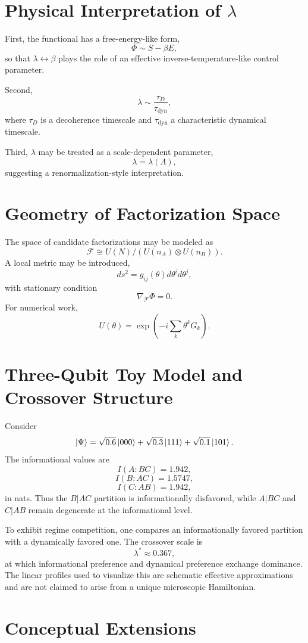 \documentclass[11pt]{article}
\begin{document}
\section{Physical Interpretation of $\lambda$}
First, the functional has a free-energy-like form,
\[
\Phi \sim S-\beta E,
\]
so that $\lambda\leftrightarrow\beta$ plays the role of an effective inverse-temperature-like control parameter.

Second,
\[
\lambda \sim \frac{\tau_D}{\tau_{\mathrm{dyn}}},
\]
where $\tau_D$ is a decoherence timescale and $\tau_{\mathrm{dyn}}$ a characteristic dynamical timescale.

Third, $\lambda$ may be treated as a scale-dependent parameter,
\[
\lambda=\lambda(\Lambda),
\]
suggesting a renormalization-style interpretation.

\section{Geometry of Factorization Space}
The space of candidate factorizations may be modeled as
\[
\mathcal{F}\cong U(N)/(U(n_A)\otimes U(n_B)).
\]
A local metric may be introduced,
\[
ds^2=g_{ij}(\theta)d\theta^i d\theta^j,
\]
with stationary condition
\[
\nabla_{\mathcal{F}}\Phi=0.
\]
For numerical work,
\[
U(\theta)=\exp\!\left(-i\sum_k \theta^k G_k\right).
\]

\section{Three-Qubit Toy Model and Crossover Structure}
Consider
\[
\ket{\Psi}=\sqrt{0.6}\ket{000}+\sqrt{0.3}\ket{111}+\sqrt{0.1}\ket{101}.
\]
The informational values are
\[
I(A:BC)=1.942,
\]
\[
I(B:AC)=1.5747,
\]
\[
I(C:AB)=1.942,
\]
in nats. Thus the $B|AC$ partition is informationally disfavored, while $A|BC$ and $C|AB$ remain degenerate at the informational level.

To exhibit regime competition, one compares an informationally favored partition with a dynamically favored one. The crossover scale is
\[
\lambda^\ast\approx0.367,
\]
at which informational preference and dynamical preference exchange dominance. The linear profiles used to visualize this are schematic effective approximations and are not claimed to arise from a unique microscopic Hamiltonian.

\section{Conceptual Extensions}
\end{document}
